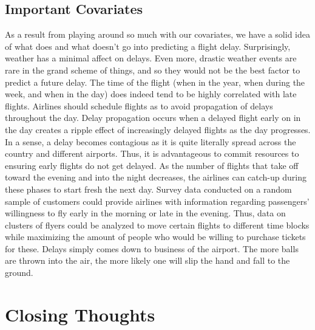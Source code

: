 \documentclass[12pt, a4paper, openany]{book}
\newcommand\tab[1][1cm]{\hspace*{#1}}
\begin{document}
	\section{Important Covariates}
	\tab As a result from playing around so much with our covariates, we have a solid idea of what does and what doesn’t go into predicting a flight delay. Surprisingly, weather has a minimal affect on delays. Even more, drastic weather events are rare in the grand scheme of things, and so they would not be the best factor to predict a future delay. The time of the flight (when in the year, when during the week, and when in the day) does indeed tend to be highly correlated with late flights. Airlines should schedule flights as to avoid propagation of delays throughout the day. Delay propagation occurs when a delayed flight early on in the day creates a ripple effect of increasingly delayed flights as the day progresses. In a sense, a delay becomes contagious as it is quite literally spread across the country and different airports. Thus, it is advantageous to commit resources to ensuring early flights do not get delayed. As the number of flights that take off toward the evening and into the night decreases, the airlines can catch-up during these phases to start fresh the next day. Survey data conducted on a random sample of customers could provide airlines with information regarding passengers’ willingness to fly early in the morning or late in the evening. Thus, data on clusters of flyers could be analyzed to move certain flights to different time blocks while maximizing the amount of people who would be willing to purchase tickets for these. Delays simply comes down to business of the airport. The more balls are thrown into the air, the more likely one will slip the hand and fall to the ground. 
\chapter{Closing Thoughts}
\end{document}
